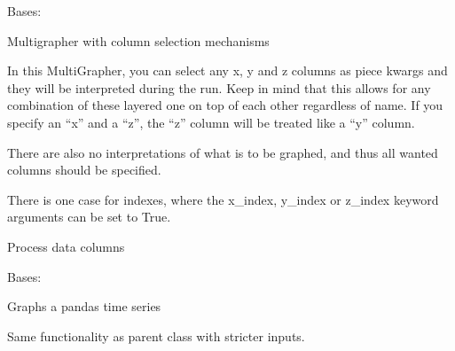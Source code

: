 \documentclass[letterpaper,10pt,english]{sphinxmanual}
\begin{document}
\begin{fulllineitems}
\label{\detokenize{dalio.application:dalio.application.graphers.PandasMultiGrapher}}
Bases: {\hyperref[\detokenize{dalio.application:dalio.application.graphers.MultiGrapher}]{}}

Multigrapher with column selection mechanisms

In this MultiGrapher, you can select any x, y and z columns as piece
kwargs and they will be interpreted during the run. Keep in mind that
this allows for any combination of these layered one on top of each other
regardless of name. If you specify an “x” and a “z”, the “z” column will
be treated like a “y” column.

There are also no interpretations of what
is to be graphed, and thus all wanted columns should be specified.

There is one case for indexes, where the x\_index, y\_index or z\_index
keyword arguments can be set to True.

\begin{fulllineitems}
\label{\detokenize{dalio.application:dalio.application.graphers.PandasMultiGrapher.build_model}}
Process data columns

\end{fulllineitems}


\end{fulllineitems}


\begin{fulllineitems}
\label{\detokenize{dalio.application:dalio.application.graphers.PandasTSGrapher}}
Bases: {\hyperref[\detokenize{dalio.application:dalio.application.graphers.PandasXYGrapher}]{}}

Graphs a pandas time series

Same functionality as parent class with stricter inputs.

\end{fulllineitems}
\end{document}
